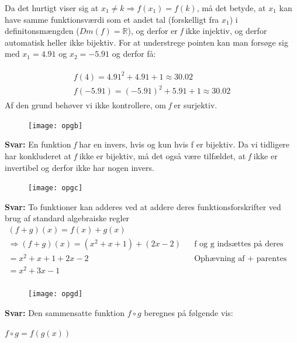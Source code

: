\documentclass{article}
\begin{document}
Da det hurtigt viser sig at $x_1 \neq k \Rightarrow f(x_1) = f(k)$, må det betyde, at $x_1$ kan have samme funktionsværdi som et andet tal (forskelligt fra $x_1$) i definitonsmængden ($Dm(f) = \mathbb{R}$), og derfor er \emph{f} ikke injektiv, og derfor automatisk heller ikke bijektiv. For at understrege pointen kan man forsøge sig med $x_1 = 4.91$ og $x_2 = -5.91$ og derfor få:

\begin{align*}
\begin{split}
f(4) = 4.91^2 + 4.91 + 1 \approx 30.02  \\
f(-5.91) = (-5.91)^2 + 5.91 + 1 \approx 30.02
\end{split}
\end{align*}
Af den grund behøver vi ikke kontrollere, om \emph{f} er surjektiv.


\begin{figure}[h]
\texttt{[image: opgb]}
\end{figure}

\textbf{Svar:} En funktion \emph{f} har en invers, hvis og kun hvis f er bijektiv. Da vi tidligere har konkluderet at \emph{f} ikke er bijektiv, må det også være tilfældet, at \emph{f} ikke er invertibel og derfor ikke har nogen invers.

\begin{figure}[h]
\texttt{[image: opgc]}
\end{figure}
\textbf{Svar:} To funktioner kan adderes ved at addere deres funktionsforskrifter ved brug af standard algebraiske regler
\begin{align*}
(f+g)(x) = f(x) + g(x) \\
\Rightarrow (f+g)(x) = (x^2 + x + 1) + (2x - 2) && \text{f og g indsættes på deres pladser} \\
= x^2 + x + 1 + 2x - 2 && \text{Ophævning af + parentes} \\
= x^2 + 3x - 1 \\
\end{align*}

\begin{figure}[h]
\texttt{[image: opgd]}
\end{figure}
\textbf{Svar:} Den sammensatte funktion $f \circ g$ beregnes på følgende vis:
\par
\begin{center}
\begin{math}
f \circ g = f(g(x))
\end{math}
\end{center}
\end{document}
